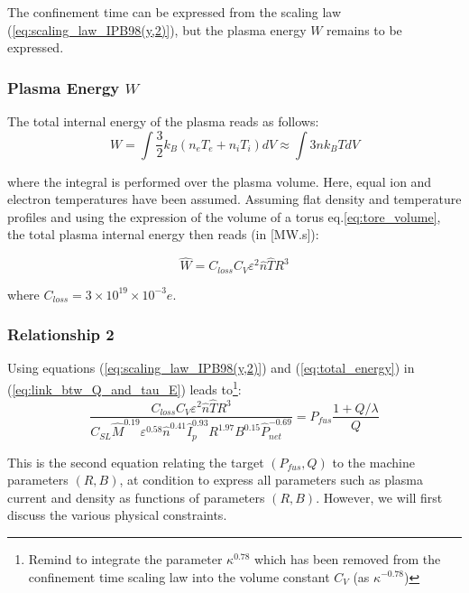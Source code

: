 The confinement time can be expressed from the scaling law (\ref{eq:scaling_law_IPB98(y,2)}), but the plasma energy $W$ remains to be expressed.


\subsubsection{Plasma Energy $W$}
The total internal energy of the plasma reads as follows:
\begin{equation*}
W  = \int \frac{3}{2} k_B \left( n_e T_e + n_i T_i \right ) dV 
\approx \int 3 n k_BT dV
\end{equation*}

\noindent
where the integral is performed over the plasma volume. Here, equal ion and electron temperatures have been assumed. Assuming flat density and temperature profiles and using the expression of the volume of a torus eq.\ref{eq:tore_volume}, the total plasma internal energy then reads (in [MW.s]):

\begin{equation}
\boxed{
	\hat W = C_{loss} C_V \varepsilon^2  \hat n \hat T R^3
	\label{eq:total_energy}
}
\end{equation}

\noindent
where $C_{loss} = 3 \times 10^{19} \times 10^{-3} e$.

\subsubsection{Relationship 2}
Using equations (\ref{eq:scaling_law_IPB98(y,2)}) and (\ref{eq:total_energy}) in (\ref{eq:link_btw_Q_and_tau_E}) leads to\footnote{Remind to integrate the parameter $\kappa^{0.78}$ which has been removed from the confinement time scaling law into the volume constant $C_V$ (as $\kappa^{-0.78}$)}:
\begin{equation}
	\frac
	{ C_{loss} C_V \varepsilon^2  \hat n \hat T R^3 }
	{C_{SL} \hat M^{0.19}  \varepsilon^{0.58} 
		\hat n^{0.41} \hat I_p^{0.93} R^{1.97} B^{0.15}  \hat P_{net}^{-0.69} }
	=
	P_{fus} \frac{1 + Q/\lambda}{Q}
\end{equation}

This is the second equation relating the target $(P_{fus}, Q)$ to the machine parameters $(R,B)$, at condition to express all parameters such as plasma current and density as functions of parameters $(R,B)$. However, we will first discuss the various physical constraints.

